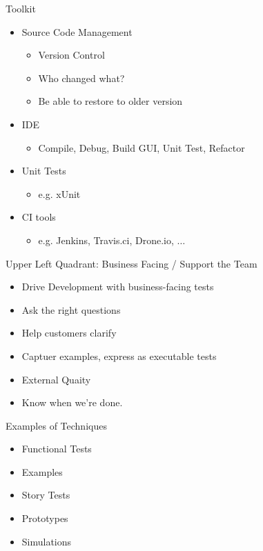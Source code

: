 \documentclass[10pt,t,a4paper]{beamer}
\begin{document}
\begin{frame}[label=sec-4]{Toolkit}
\begin{itemize}
\item Source Code Management
\begin{itemize}
\item Version Control
\item Who changed what?
\item Be able to restore to older version
\end{itemize}
\item IDE
\begin{itemize}
\item Compile, Debug, Build GUI, Unit Test, Refactor
\end{itemize}
\item Unit Tests
\begin{itemize}
\item e.g. xUnit
\end{itemize}
\item CI tools
\begin{itemize}
\item e.g. Jenkins, Travis.ci, Drone.io, $\ldots$
\end{itemize}
\end{itemize}
\end{frame}
\begin{frame}[shrink=15,label=sec-5]{Upper Left Quadrant: Business Facing / Support the Team}

\begin{itemize}
\item Drive Development with business-facing tests
\item Ask the right questions
\item Help customers clarify
\item Captuer examples, express as executable tests
\item External Quaity
\item Know when we're done.
\end{itemize}
\begin{block}{Examples of Techniques}
\begin{itemize}
\item Functional Tests
\item Examples
\item Story Tests
\item Prototypes
\item Simulations
\end{itemize}
\end{block}
\end{frame}
\end{document}
